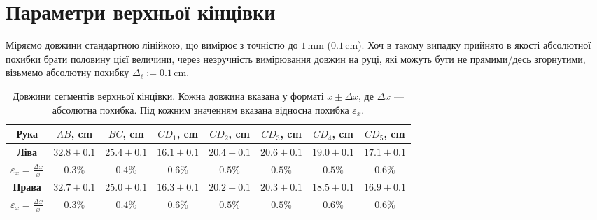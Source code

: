 \documentclass{hw_template}
\begin{document}
\newpage

\section{Параметри верхньої кінцівки}

Міряємо довжини стандартною лінійкою, що вимірює з точністю до $1\,\text{mm}$ ($0.1\,\text{cm}$). Хоч в такому 
випадку прийнято в якості абсолютної похибки брати половину цієї величини, через 
незручність вимірювання довжин на руці, які можуть бути не прямими/десь згорнутими,
візьмемо абсолютну похибку $\Delta_{\ell}:=0.1\,\text{cm}$.  

\begin{table}[H]
    \centering
    \begin{tabular}{c:ccccccc}
        \hline
        \textbf{Рука} & \textbf{$AB$, cm} & \textbf{$BC$, cm} & \textbf{$CD_1$, cm} & \textbf{$CD_2$, cm} & \textbf{$CD_3$, cm} & \textbf{$CD_4$, cm} & \textbf{$CD_5$, cm} \\
        \hline
        \textbf{Ліва} & $32.8 \pm 0.1$ & $25.4 \pm 0.1$ & $16.1 \pm 0.1$ & $20.4 \pm 0.1$ & $20.6 \pm 0.1$ & $19.0 \pm 0.1$ & $17.1 \pm 0.1$ \\
        $\varepsilon_x = \frac{\Delta x}{x}$ & $0.3\%$ & $0.4\%$ & $0.6\%$ & $0.5\%$ & $0.5\%$ & $0.5\%$ & $0.6\%$ \\
        \hdashline
        \textbf{Права} & $32.7 \pm 0.1$ & $25.0 \pm 0.1$ & $16.3 \pm 0.1$ & $20.2 \pm 0.1$ & $20.3 \pm 0.1$ & $18.5 \pm 0.1$ & $16.9 \pm 0.1$ \\
        $\varepsilon_x = \frac{\Delta x}{x}$ & $0.3\%$ & $0.4\%$ & $0.6\%$ & $0.5\%$ & $0.5\%$ & $0.6\%$ & $0.6\%$ \\
        \hline
    \end{tabular}
    \caption{Довжини сегментів верхньої кінцівки. Кожна довжина вказана у форматі $x \pm \Delta x$, де $\Delta x$ --- абсолютна похибка. Під кожним значенням вказана відносна похибка $\varepsilon_x$.}
\end{table}
\end{document}
